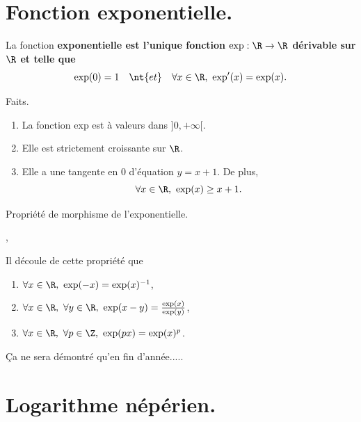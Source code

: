 \documentclass[11pt]{article}
\begin{document}


\thispagestyle{fancy}

\section{Fonction exponentielle.}

\begin{defi}{}{}
    La fonction \bf{exponentielle} est l'unique fonction $\exp:\R\to\R$ dérivable sur $\R$ et telle que
    \begin{equation*}
        \exp(0)=1\quad\nt{et}\quad\forall x\in\R,~\exp'(x)=\exp(x).
    \end{equation*}
\end{defi}

\begin{prop}{Faits.}{}
    \begin{enumerate}
        \item La fonction exp est à valeurs dans $]0,+\infty[$.
        \item Elle est strictement croissante sur $\R$.
        \item Elle a une tangente en 0 d'équation $y=x+1$. De plus,
        \begin{equation*}
            \forall x \in \R,~\exp(x)\geq x+1.
        \end{equation*}
    \end{enumerate}
\end{prop}

\begin{thm}{Propriété de morphisme de l'exponentielle.}{}
    \begin{center}
        ,
    \end{center}
    Il découle de cette propriété que
    \begin{enumerate}
        \item $\forall x \in \R, ~ \exp(-x)=\exp(x)^{-1}$,
        \item $\forall x \in \R, ~ \forall y \in \R, ~ \exp(x-y)=\frac{\exp(x)}{\exp(y)}$,
        \item $\forall x \in \R, ~ \forall p \in \Z, ~ \exp(px)=\exp(x)^p$.
    \end{enumerate}
    \tcblower
    Ça ne sera démontré qu'en fin d'année.....
\end{thm}

\section{Logarithme népérien.}
\end{document}
